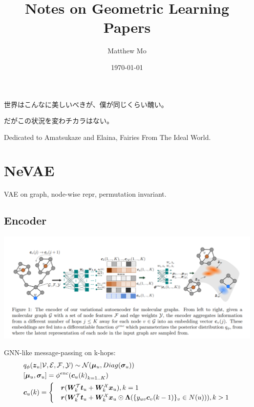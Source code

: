 \documentclass{article}
\title{\textbf{Notes on Geometric Learning Papers}}
\author{Matthew Mo}
\date{\today}
\begin{document}
\maketitle
\section*{ }
\label{contents}
\tableofcontents

\newenvironment{dedication}
    {\clearpage           %
    \thispagestyle{empty}%
    \vspace*{\stretch{1}}%
    \itshape \Large             %
    \raggedleft          %
    }
    {\par %
    \vspace{\stretch{3}} %
    \clearpage           %
    }

\begin{dedication}
    {
    \mincho
    世界はこんなに美しいべきが、僕が同じくらい醜い。

    だがこの状況を変わチカラはない。
    }

    Dedicated to Amatsukaze and Elaina, Fairies From The Ideal World.
\end{dedication}


\section{NeVAE}
     VAE on graph, node-wise repr, permutation invariant.
    \subsection{Encoder}
    \centerline{\includegraphics[width=0.85\paperwidth]{nevae-enc.PNG}}

    GNN-like message-passing on k-hops:
    \begin{align}
        &q_\phi(\boldsymbol{z}_u|\mathcal{V,E,F,Y})\sim\mathcal{N}(\boldsymbol{\mu}_u,Diag(\boldsymbol{\sigma}_u))\\
        &[\boldsymbol{\mu}_u, \boldsymbol{\sigma}_u]=\phi^{enc}({\boldsymbol{c}_u(k)}_{k=1..K})\\
        &\boldsymbol{c}_u(k)=
        \begin{cases}
            &\boldsymbol{r}(\boldsymbol{W}_k^\mathcal{T}\boldsymbol{t}_u + \boldsymbol{W}_k^\mathcal{X}\boldsymbol{x}_u),k=1\\
            &\boldsymbol{r}(\boldsymbol{W}_k^\mathcal{T}\boldsymbol{t}_u + \boldsymbol{W}_k^\mathcal{X}\boldsymbol{x}_u\odot \boldsymbol{\Lambda}(\{y_{uv} \boldsymbol{c}_v(k-1)\}_v\in N(u))),k>1
        \end{cases}
    \end{align}
\end{document}
